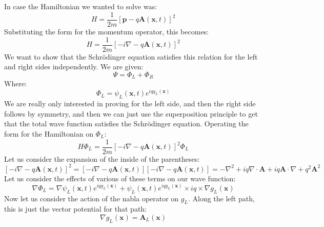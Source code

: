 \documentclass[12pt]{article}
\begin{document}
\subsection{}
In case the Hamiltonian we wanted to solve was:
\begin{equation}
  H=\frac{1}{2 m}[\mathbf{p}-q \mathbf{A}(\mathbf{x}, t)]^{2}
\end{equation}
Substituting the form for the momentum operator, this becomes:
\begin{equation}
  H=\frac{1}{2 m}[-i \nabla -q \mathbf{A}(\mathbf{x}, t)]^{2}
\end{equation}
We want to show that the Schrödinger equation satisfies this relation for the left and right sides independently.
We are given:
\begin{equation}
  \Psi  = \Phi_L + \Phi_R 
\end{equation}
Where:
\begin{equation}
  \Phi_L = \psi_{L}(\mathbf{x}, t) e^{i q g_{L}(\mathbf{x})}
\end{equation}
We are really only interested in proving for the left side, and then the right side follows by symmetry, and then we can just use the superposition principle to get that the total wave function satisfies the Schrödinger equation.
Operating the form for the Hamiltonian on $\Phi_L$:
\begin{equation}
  H \Phi_L = \frac{1}{2 m}[-i \nabla -q \mathbf{A}(\mathbf{x}, t)]^{2} \Phi_L
\end{equation}
Let us consider the expansion of the inside of the parentheses:
\begin{equation}
  \left[-i \nabla -q \mathbf{A}(\mathbf{x}, t)\right]^{2} = \left[-i \nabla -q \mathbf{A}(\mathbf{x}, t)\right] \left[-i \nabla -q \mathbf{A}(\mathbf{x}, t)\right] = - \nabla^2 + i q \nabla \cdot \mathbf{A} + i q \mathbf{A} \cdot \nabla + q^2 \mathbf{A}^2
\end{equation}
Let us consider the effects of various of these terms on our wave function:
\begin{equation}
  \nabla \Phi_L = \nabla \psi_{L}(\mathbf{x}, t) e^{i q g_{L}(\mathbf{x})} + \psi_{L}(\mathbf{x}, t) e^{i q g_{L}(\mathbf{x})} \times i q \times \nabla g_{L}(\mathbf{x})
\end{equation}
Now let us consider the action of the nabla operator on $g_L$. Along the left path, this is just the vector potential for that path:
\begin{equation}
  \nabla g_L(\mathbf{x}) = \mathbf{A}_L(\mathbf{x})
\end{equation}
\end{document}
